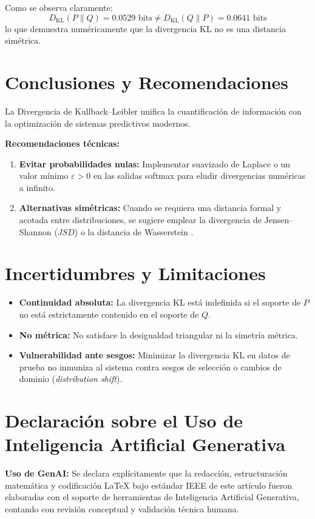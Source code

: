 \documentclass[conference]{IEEEtran}
\begin{document}
	\noindent Como se observa claramente:
	\begin{equation}
		D_{\text{KL}}(P \parallel Q) = 0.0529 \text{ bits} \neq D_{\text{KL}}(Q \parallel P) = 0.0641 \text{ bits}
	\end{equation}
	lo que demuestra numéricamente que la divergencia KL no es una distancia simétrica.
	
	\section{Conclusiones y Recomendaciones}
	La Divergencia de Kullback--Leibler unifica la cuantificación de información con la optimización de sistemas predictivos modernos.
	
	\noindent \textbf{Recomendaciones técnicas:}
	\begin{enumerate}
		\item \textbf{Evitar probabilidades nulas:} Implementar suavizado de Laplace o un valor mínimo $\varepsilon > 0$ en las salidas softmax para eludir divergencias numéricas a infinito.
		\item \textbf{Alternativas simétricas:} Cuando se requiera una distancia formal y acotada entre distribuciones, se sugiere emplear la divergencia de Jensen--Shannon ($JSD$) o la distancia de Wasserstein \cite{wang2026generalized}.
	\end{enumerate}
	
	\section{Incertidumbres y Limitaciones}
	\begin{itemize}
		\item \textbf{Continuidad absoluta:} La divergencia KL está indefinida si el soporte de $P$ no está estrictamente contenido en el soporte de $Q$.
		\item \textbf{No métrica:} No satisface la desigualdad triangular ni la simetría métrica.
		\item \textbf{Vulnerabilidad ante sesgos:} Minimizar la divergencia KL en datos de prueba no inmuniza al sistema contra sesgos de selección o cambios de dominio (\textit{distribution shift}).
	\end{itemize}
	
	\section*{Declaración sobre el Uso de Inteligencia Artificial Generativa}
	\noindent \textbf{Uso de GenAI:} Se declara explícitamente que la redacción, estructuración matemática y codificación \LaTeX{} bajo estándar IEEE de este artículo fueron elaboradas con el soporte de herramientas de Inteligencia Artificial Generativa, contando con revisión conceptual y validación técnica humana.
	
\end{document}
